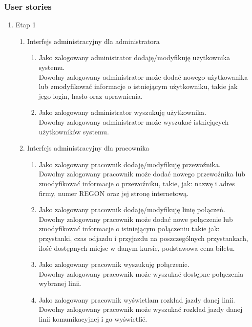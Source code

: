 \documentclass[10pt,a4paper]{article}
\begin{document}
\subsubsection*{User stories}
\begin{enumerate}
	\bfseries
	\item Etap 1
	\begin{enumerate}[label*=\arabic*.]
	\item Interfejs administracyjny dla administratora
		\begin{enumerate}[label*=\arabic*.]
			\mdseries
			\item Jako zalogowany administrator dodaję/modyfikuję użytkownika systemu.\\
				Dowolny zalogowany administrator może dodać nowego użytkowanika lub zmodyfikować informacje o istniejącym użytkowniku, takie jak jego login, hasło oraz uprawnienia.
			\item Jako zalogowany administrator wyszukuję użytkownika. \\
			    Dowolny zalogowany administrator może wyszukać istniejących użytkowników systemu.
		\end{enumerate}
		\item Interfejs administracyjny dla pracownika
		\begin{enumerate}[label*=\arabic*.]
			\mdseries
			\item Jako zalogowany pracownik dodaję/modyfikuję przewoźnika. \\
				Dowolny zalogowany pracownik może dodać nowego przewoźnika lub zmodyfikować informacje o przewoźniku, takie, jak: nazwę i adres firmy, numer REGON oraz jej stronę internetową.
			\item Jako zalogowany pracownik dodaję/modyfikuję linię połączeń. \\
				Dowolny zalogowany pracownik może dodać nowe połączenie lub zmodyfikować informacje o istniejącym połączeniu takie jak: przystanki, czas odjazdu i przyjazdu na poszczególnych przystankach, ilość dostępnych miejsc w danym kursie, podstawowa cena biletu.
			\item Jako zalogowany pracownik wyszukuję połączenie. \\
			    Dowolny zalogowany pracownik może wyszukać dostępne połączenia wybranej linii.
		 	\item Jako zalogowany pracownik wyświetlam rozkład jazdy danej linii. \\
			    Dowolny zalogowany pracownik może wyszukać rozkład jazdy danej linii
			    komunikacyjnej i go wyświetlić.

\end{enumerate}
\end{enumerate}
\end{enumerate}
\end{document}
